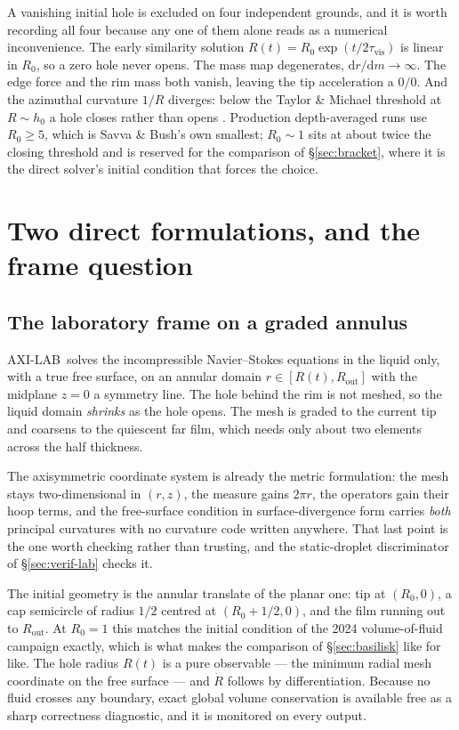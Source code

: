 \documentclass[11pt,a4paper]{article}
\newcommand{\LAB}{\textsf{AXI-LAB}}
\begin{document}
A vanishing initial hole is excluded on four independent grounds, and it is
worth recording all four because any one of them alone reads as a numerical
inconvenience. The early similarity solution $R(t) = R_{0}\exp(t/2\tau_{\mathrm{vis}})$
is linear in $R_{0}$, so a zero hole never opens. The mass map degenerates,
$\mathrm{d}r/\mathrm{d}m\to\infty$. The edge force and the rim mass both vanish,
leaving the tip acceleration a $0/0$. And the azimuthal curvature $1/R$
diverges: below the Taylor \& Michael threshold at $R\sim h_{0}$ a hole closes
rather than opens \cite{taylor1973}. Production depth-averaged runs use
$R_{0}\ge 5$, which is Savva \& Bush's own smallest; $R_{0}\sim1$ sits at about
twice the closing threshold and is reserved for the comparison of
\S\ref{sec:bracket}, where it is the direct solver's initial condition that
forces the choice.

\section{Two direct formulations, and the frame question}
\label{sec:dns}

\subsection{The laboratory frame on a graded annulus}

\LAB\ solves the incompressible Navier--Stokes equations in the liquid only,
with a true free surface, on an annular domain $r\in[R(t), R_{\mathrm{out}}]$
with the midplane $z=0$ a symmetry line. The hole behind the rim is not meshed,
so the liquid domain \emph{shrinks} as the hole opens. The mesh is graded to the
current tip and coarsens to the quiescent far film, which needs only about two
elements across the half thickness.

The axisymmetric coordinate system is already the metric formulation: the mesh
stays two-dimensional in $(r,z)$, the measure gains $2\pi r$, the operators gain
their hoop terms, and the free-surface condition in surface-divergence form
carries \emph{both} principal curvatures with no curvature code written
anywhere. That last point is the one worth checking rather than trusting, and
the static-droplet discriminator of \S\ref{sec:verif-lab} checks it.

The initial geometry is the annular translate of the planar one: tip at
$(R_{0},0)$, a cap semicircle of radius $1/2$ centred at $(R_{0}+1/2,0)$, and
the film running out to $R_{\mathrm{out}}$. At $R_{0}=1$ this matches the
initial condition of the 2024 volume-of-fluid campaign \cite{basilisk} exactly, which is what
makes the comparison of \S\ref{sec:basilisk} like for like. The hole radius
$R(t)$ is a pure observable --- the minimum radial mesh coordinate on the free
surface --- and $\dot{R}$ follows by differentiation. Because no fluid crosses
any boundary, exact global volume conservation is available free as a sharp
correctness diagnostic, and it is monitored on every output.
\end{document}
